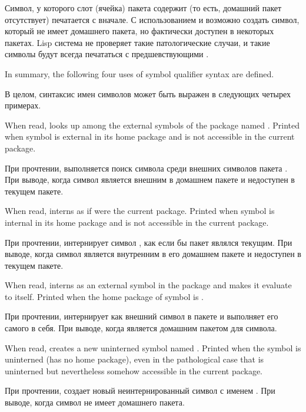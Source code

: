 Символ, у которого слот (ячейка) пакета содержит {\false} (то есть, домашний
пакет отсутствует) печатается с \cd{\#:} вначале. С использованием 
и  возможно создать символ, который не имеет домашнего пакета, но
фактически доступен в некоторых пакетах.
Lisp система не проверяет такие патологические случаи, и такие символы будут
всегда печататься с предшевствующими \cd{\#:}.

In summary, the following four uses of symbol qualifier syntax are defined.

В целом, синтаксис имен символов может быть выражен в следующих четырех примерах.

\begin{flushdesc}
\item[\cd{foo:bar}]
When read, looks up  among the external symbols of
the package named .  Printed when symbol  is external in its
home package  and is not accessible in the current package.

При прочтении, выполняется поиск символа  среди внешних символов пакета
. При выводе, когда символ  является внешним в домашнем пакете
 и недоступен в текущем пакете.

\item[\cd{foo::bar}]
When read, interns  as if  were the
current package.  Printed when symbol  is internal in its home package
 and is not accessible in the current package.

При прочтении, интернирует символ , как если бы пакет  являлся
текущим. При выводе, когда символ  является внутренним в его домашнем
пакете  и недоступен в текущем пакете.

\item[\cd{:bar}]
When read, interns  as an external symbol in the
 package and makes it evaluate to itself.  Printed when
the home package of symbol  is .

При прочтении, интернирует  как внешний символ в пакете  и
выполняет его самого в себя. При выводе, когда  является домашним
пакетом для символа.
    
\item[\cd{\#:bar}]
When read, creates a new uninterned symbol named .
Printed when the symbol  is uninterned (has no home package),
even in the pathological case that  is uninterned but
nevertheless somehow accessible in the current package.

При прочтении, создает новый неинтернированный символ с именем .
При выводе, когда символ  не имеет домашнего пакета.
\end{flushdesc}

